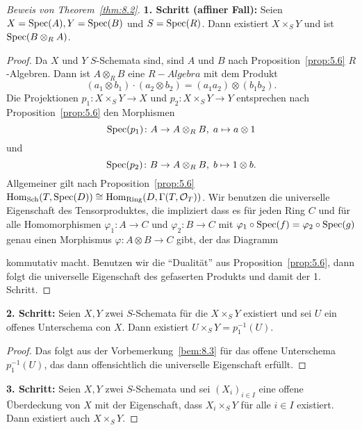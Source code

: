 \begin{proof}[Beweis von Theorem~\ref{thm:8.2}]
	\textbf{1. Schritt (affiner Fall):} Seien $X = \operatorname{Spec}(A), Y = \operatorname{Spec}(B)$ und $S=\operatorname{Spec}(R)$. Dann existiert $X\times_S Y$ und ist $\operatorname{Spec}(B \otimes_R A)$.
	\begin{proof}
		Da $X$ und $Y$ $S$-Schemata sind, sind $A$ und $B$ nach Proposition~\ref{prop:5.6} $R$-Algebren. Dann ist $A \otimes_R B$ eine $R-Algebra$ mit dem Produkt
		\[
			(a_1 \otimes b_1) \cdot (a_2 \otimes b_2) = (a_1a_2)\otimes (b_1b_2).
		\]
		Die Projektionen $p_1\colon X\times_S Y \to X$ und $p_2\colon X \times_S Y \to Y$ entsprechen nach Proposition~\ref{prop:5.6} den Morphismen
		\[
			\operatorname{Spec}(p_1)\colon A \to A \otimes_R B,\; a \mapsto a \otimes 1
		\]
		und
		\[
			\operatorname{Spec}(p_2)\colon B \to A \otimes_R B,\; b \mapsto 1 \otimes b.
		\]
		Allgemeiner gilt nach Proposition~\ref{prop:5.6} $\operatorname{Hom}_{\operatorname{Sch}}(T, \operatorname{Spec}(D)) \cong \operatorname{Hom}_{\operatorname{Ring}}(D,\Gamma(T,\mathcal{O}_T))$. Wir benutzen die universelle Eigenschaft des Tensorproduktes, die impliziert dass es für jeden Ring $C$ und für alle Homomorphismen $\varphi_1\colon A \to C$ und $\varphi_2\colon B \to C$ mit $\varphi_1 \circ \operatorname{Spec}(f) = \varphi_2 \circ \operatorname{Spec}(g)$ genau einen Morphismus $\varphi\colon A \otimes B \to C$ gibt, der das Diagramm
		\begin{center}
		\end{center}
		kommutativ macht. Benutzen wir die \enquote{Dualität} aus Proposition~\ref{prop:5.6}, dann folgt die universelle Eigenschaft des gefaserten Produkts und damit der 1. Schritt.
	\end{proof}
	\textbf{2. Schritt:} Seien $X,Y$ zwei $S$-Schemata für die $X\times_S Y$ existiert und sei $U$ ein offenes Unterschema con $X$. Dann existiert $U \times_S Y = p_1^{-1}(U)$.
	\begin{proof}
		Das folgt aus der Vorbemerkung~\ref{bem:8.3} für das offene Unterschema $p_1^{-1}(U)$, das dann offensichtlich die universelle Eigenschaft erfüllt.
	\end{proof}
	\textbf{3. Schritt:} Seien $X,Y$ zwei $S$-Schemata und sei $(X_i)_{i\in I}$ eine offene Überdeckung von $X$ mit der Eigenschaft, dass $X_i\times_S Y$ für alle $i \in I$ existiert. Dann existiert auch $X \times_S Y$.

\end{proof}
